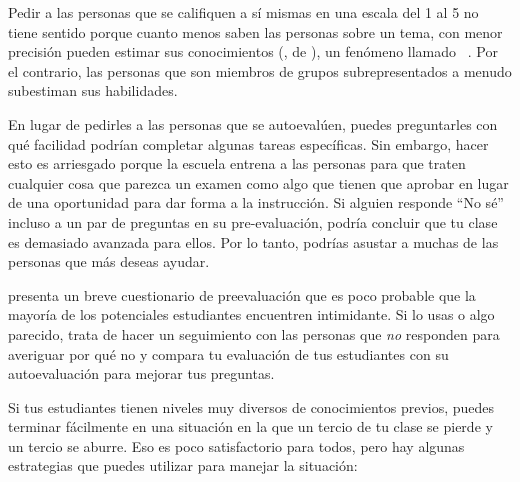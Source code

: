 Pedir a las personas que se califiquen a sí mismas en una escala del 1 al 5 no tiene sentido
porque cuanto menos saben las personas sobre un tema, 
con menor precisión pueden estimar sus conocimientos
(,
de ),
un fenómeno llamado  ~\cite{Krug1999}.
Por el contrario,
las personas que son miembros de grupos subrepresentados a menudo subestiman sus habilidades.


En lugar de pedirles a las personas que se autoevalúen,
puedes preguntarles con qué facilidad podrían completar algunas tareas específicas.
Sin embargo,
hacer esto es arriesgado
porque la escuela entrena a las personas
para que traten cualquier cosa que parezca un examen como algo que tienen que aprobar
en lugar de una oportunidad para dar forma a la instrucción.
Si alguien responde ``No sé'' incluso a un par de preguntas en su pre-evaluación,
podría concluir que tu clase es demasiado avanzada para ellos.
Por lo tanto, podrías asustar a muchas de las personas que más deseas ayudar.

 presenta un breve cuestionario de preevaluación
que es poco probable que la mayoría de los potenciales estudiantes encuentren intimidante.
Si lo usas o algo parecido,
trata de hacer un seguimiento con las personas que \emph{no} responden para averiguar por qué no
y compara tu evaluación de tus estudiantes con su autoevaluación
para mejorar tus preguntas.


Si tus estudiantes tienen niveles muy diversos de conocimientos previos,
puedes terminar fácilmente en una situación en la que un tercio de tu clase se pierde
y un tercio se aburre.
Eso es poco satisfactorio para todos,
pero hay algunas estrategias que puedes utilizar para manejar la situación:

